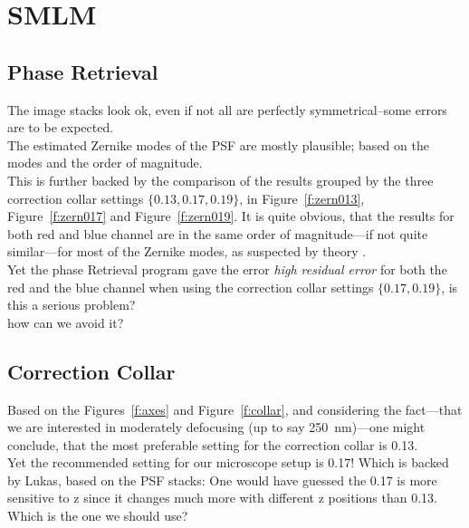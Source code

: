 \documentclass[11pt, a4paper, oneside, twocolumn]{report}
\renewcommand{\t}{\todo}
\newcommand{\e}{\emph}
\begin{document}
\section{SMLM}


\subsection{Phase Retrieval}

The image stacks look ok, even if not all are perfectly
symmetrical--some errors are to be expected.\\

The estimated Zernike modes of the PSF are mostly plausible; based on
the modes and the order of magnitude.\\

This is further backed by the comparison of the results grouped by the
three correction collar settings $\{0.13,0.17,0.19\}$, in
Figure~\ref{f:zern013}, Figure~\ref{f:zern017} and
Figure~\ref{f:zern019}. It is quite obvious, that the results for both
red and blue channel are in the same order of magnitude---if not quite
similar---for most of the Zernike modes, as suspected by theory
\t{zern}.\\

Yet the phase Retrieval program gave the error \e{high residual error}
for both the red and the blue channel when using the correction collar
settings $\{0.17,0.19\}$, is this a serious problem?\\

how can we avoid it?


\subsection{Correction Collar}

Based on the Figures~\ref{f:axes} and Figure~\ref{f:collar}, and
considering the fact---that we are interested in moderately defocusing
(up to say 250~nm)---one might conclude, that the most preferable
setting for the correction collar is 0.13.\\

Yet the recommended setting for our microscope setup is 0.17! Which is
backed by Lukas, based on the PSF stacks: One would have guessed the
0.17 is more sensitive to z since it changes much more with different
z positions than 0.13.\\

Which is the one we should use?\\
\end{document}
